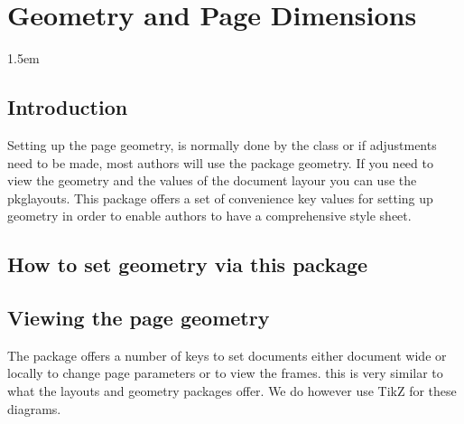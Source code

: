 \def\readability{%
\begin{tabular}{ll}
Characters per line &\charactersperline\\
Alphabets per line &\alphabetsperline\\
Alphabet length &\alphabetlength\\
Baselineskip & \the\baselineskip\\
Number of text lines &\numbertextlines\\
Text area ratio & \textarearatio\\
Text/page height ratio & \textheightratio\\
Top margin  &\thetop\\
Bottom margin & \thebottom\\
Vertical margin ratio &\verticalmarginratio\\
Horizontal margin ratio &1:\horizontalmarginratio\\
\end{tabular}}


\chapter{Geometry and Page Dimensions}
\parindent1.5em
\section{Introduction}




Setting up the page geometry, is normally done by the class or if adjustments need to be made, most authors will use the package geometry. If you need to view the geometry and the values of the document layour you can use the pkg{layouts}. This package offers a set of convenience key values for setting up geometry in order to enable authors to have a comprehensive style sheet.

\section{How to set geometry via this package}

\section{Viewing the page geometry}

The package offers a number of keys to set documents either document wide or locally to change page 
parameters or to view the frames. this is very similar to what the layouts and geometry packages offer. We do
however use TikZ for these diagrams.

